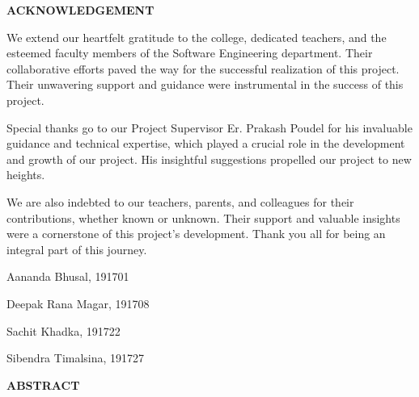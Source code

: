 \documentclass[a4paper,12pt]{article}
\begin{document}
		\setmainfont{Times New Roman}
		\setlength{\parindent}{0pt}
		\setlength{\parskip}{6pt}
								


        \newpage
		\begin{flushleft}
			\fontsize{14}{16}\selectfont\textbf{ACKNOWLEDGEMENT}
			\label{pageI}
		\end{flushleft}

  We extend our heartfelt gratitude to the college, dedicated teachers, and the esteemed faculty members of the Software Engineering department. Their collaborative efforts paved the way for the successful realization of this project. Their unwavering support and guidance were instrumental in the success of this project.

Special thanks go to our Project Supervisor Er. Prakash Poudel for his invaluable guidance and technical expertise, which played a crucial role in the development and growth of our project. His insightful suggestions propelled our project to new heights.

We are also indebted to our teachers, parents, and colleagues for their contributions, whether known or unknown. Their support and valuable insights were a cornerstone of this project's development. Thank you all for being an integral part of this journey.

\vspace{12pt}

Aananda Bhusal, 191701

Deepak Rana Magar, 191708

Sachit Khadka, 191722

Sibendra Timalsina, 191727



  
								
		\newpage
		\begin{flushleft}
			\fontsize{14}{16}\selectfont\textbf{ABSTRACT}
			\phantomsection
			\label{pageII}
		\end{flushleft}
								
\end{document}
